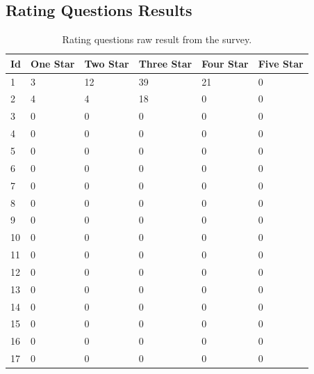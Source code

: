 \documentclass[a4paper,12pt]{article}
\begin{document}
    \subsection{Rating Questions Results}
    \label{subsec:ratingresults}
    \begin{table}[!htbp]
        \begin{center}
            \begin{tabularx}{\textwidth}{llllll}
                \toprule
                Id & One Star & Two Star & Three Star & Four Star & Five Star \\
                \midrule
                1  & 3        & 12       & 39         & 21        & 0         \\
                2  & 4        & 4        & 18         & 0         & 0         \\
                3  & 0        & 0        & 0          & 0         & 0         \\
                4  & 0        & 0        & 0          & 0         & 0         \\
                5  & 0        & 0        & 0          & 0         & 0         \\
                6  & 0        & 0        & 0          & 0         & 0         \\
                7  & 0        & 0        & 0          & 0         & 0         \\
                8  & 0        & 0        & 0          & 0         & 0         \\
                9  & 0        & 0        & 0          & 0         & 0         \\
                10 & 0        & 0        & 0          & 0         & 0         \\
                11 & 0        & 0        & 0          & 0         & 0         \\
                12 & 0        & 0        & 0          & 0         & 0         \\
                13 & 0        & 0        & 0          & 0         & 0         \\
                14 & 0        & 0        & 0          & 0         & 0         \\
                15 & 0        & 0        & 0          & 0         & 0         \\
                16 & 0        & 0        & 0          & 0         & 0         \\
                17 & 0        & 0        & 0          & 0         & 0         \\
                \bottomrule
            \end{tabularx}
        \end{center}
        \caption{\label{tab:rawratingquestionresultstable} Rating questions raw result from the survey.}
    \end{table}
\end{document}
